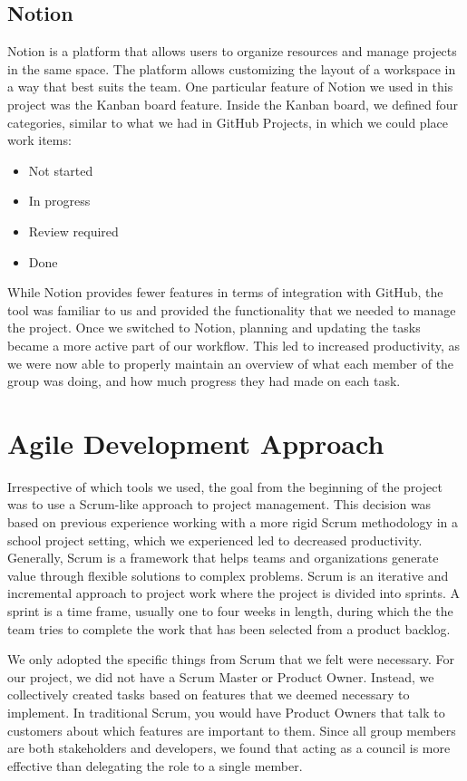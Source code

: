 \subsection{Notion}
Notion is a platform that allows users to organize resources and manage projects in the same space. The platform allows customizing the layout of a workspace in a way that best suits the team. One particular feature of Notion we used in this project was the Kanban board feature. Inside the Kanban board, we defined four categories, similar to what we had in GitHub Projects, in which we could place work items:

\begin{itemize}
    \item Not started
    \item In progress
    \item Review required
    \item Done
\end{itemize}

While Notion provides fewer features in terms of integration with GitHub, the tool was familiar to us and provided the functionality that we needed to manage the project.
Once we switched to Notion, planning and updating the tasks became a more active part of our workflow. This led to increased productivity, as we were now able to properly maintain an overview of what each member of the group was doing, and how much progress they had made on each task.

\section{Agile Development Approach} \label{sec:agile-dev}
Irrespective of which tools we used, the goal from the beginning of the project was to use a Scrum-like approach to project management.
This decision was based on previous experience working with a more rigid Scrum methodology in a school project setting, which we experienced led to decreased productivity.
Generally, Scrum is a framework that helps teams and organizations generate value through flexible solutions to complex problems. Scrum is an iterative and incremental approach to project work where the project is divided into sprints. A sprint is a time frame, usually one to four weeks in length, during which the the team tries to complete the work that has been selected from a product backlog\cite{sutherlandScrumArtDoing2014}.

We only adopted the specific things from Scrum that we felt were necessary. For our project, we did not have a Scrum Master or Product Owner. Instead, we collectively created tasks based on features that we deemed necessary to implement.
In traditional Scrum, you would have Product Owners that talk to customers about which features are important to them. Since all group members are both stakeholders and developers, we found that acting as a council is more effective than delegating the role to a single member.

